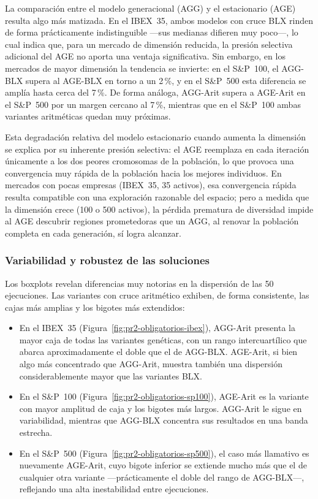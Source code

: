 La comparación entre el modelo generacional (AGG) y el estacionario (AGE) resulta algo más matizada. En el IBEX~35, ambos modelos con cruce BLX rinden de forma prácticamente indistinguible ---sus medianas difieren muy poco---, lo cual indica que, para un mercado de dimensión reducida, la presión selectiva adicional del AGE no aporta una ventaja significativa. Sin embargo, en los mercados de mayor dimensión la tendencia se invierte: en el S\&P~100, el AGG-BLX supera al AGE-BLX en torno a un 2\,\%, y en el S\&P~500 esta diferencia se amplía hasta cerca del 7\,\%. De forma análoga, AGG-Arit supera a AGE-Arit en el S\&P~500 por un margen cercano al 7\,\%, mientras que en el S\&P~100 ambas variantes aritméticas quedan muy próximas.

Esta degradación relativa del modelo estacionario cuando aumenta la dimensión se explica por su inherente presión selectiva: el AGE reemplaza en cada iteración únicamente a los dos peores cromosomas de la población, lo que provoca una convergencia muy rápida de la población hacia los mejores individuos. En mercados con pocas empresas (IBEX~35, 35 activos), esa convergencia rápida resulta compatible con una exploración razonable del espacio; pero a medida que la dimensión crece (100 o 500 activos), la pérdida prematura de diversidad impide al AGE descubrir regiones prometedoras que un AGG, al renovar la población completa en cada generación, sí logra alcanzar.

\subsubsection*{Variabilidad y robustez de las soluciones}

Los boxplots revelan diferencias muy notorias en la dispersión de las 50 ejecuciones. Las variantes con cruce aritmético exhiben, de forma consistente, las cajas más amplias y los bigotes más extendidos:

\begin{itemize}
    \item En el IBEX~35 (Figura~\ref{fig:pr2-obligatorios-ibex}), AGG-Arit presenta la mayor caja de todas las variantes genéticas, con un rango intercuartílico que abarca aproximadamente el doble que el de AGG-BLX. AGE-Arit, si bien algo más concentrado que AGG-Arit, muestra también una dispersión considerablemente mayor que las variantes BLX.
    \item En el S\&P~100 (Figura~\ref{fig:pr2-obligatorios-sp100}), AGE-Arit es la variante con mayor amplitud de caja y los bigotes más largos. AGG-Arit le sigue en variabilidad, mientras que AGG-BLX concentra sus resultados en una banda estrecha.
    \item En el S\&P~500 (Figura~\ref{fig:pr2-obligatorios-sp500}), el caso más llamativo es nuevamente AGE-Arit, cuyo bigote inferior se extiende mucho más que el de cualquier otra variante ---prácticamente el doble del rango de AGG-BLX---, reflejando una alta inestabilidad entre ejecuciones.
\end{itemize}

